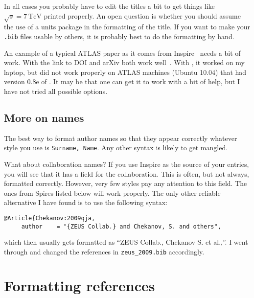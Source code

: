 In all cases you probably have to edit the titles a bit to get
things like $\sqrt{s} = \SI{7}{\TeV}$ printed properly. An open
question is whether you should assume the use of a units package in
the formatting of the title. If you want to make your \texttt{.bib}
files usable by others, it is probably best to do the formatting by
hand.

An example of a typical ATLAS paper as it comes from
Inspire~\cite{Aad:2010ey-inspire} needs a bit of work.  With  the link to DOI and arXiv both work well~\cite{Aad:2010ey-final}.
With , it worked on my laptop, but did not work properly
on ATLAS machines (Ubuntu 10.04) that had version 0.8e of .
It may be that one can get it to work with a bit of help, but I have
not tried all possible options.



\subsection{More on names}
\label{sec:ref:names}

The best way to format author names so that they appear correctly
whatever \BibTeX{} style you use is \texttt{Surname, Name}. Any other
syntax is likely to get mangled.

What about collaboration names? If you use Inspire as the source of
your \BibTeX{} entries, you will see that it has a field for the
collaboration. This is often, but not always, formatted
correctly. However, very few \BibTeX{} styles pay any attention to
this field. The ones from Spires listed below will work properly. The
only other reliable alternative I have found is to use the following
syntax:
\begin{verbatim}
@Article{Chekanov:2009qja,
     author    = "{ZEUS Collab.} and Chekanov, S. and others",
\end{verbatim}
which then usually gets formatted as \enquote{ZEUS Collab., Chekanov S. et
al.,}.
I went through and changed the references in \texttt{zeus\_2009.bib}
accordingly.


\section{Formatting references}
\label{sec:ref:format}

